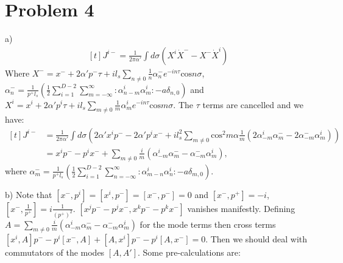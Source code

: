 \documentclass[12pt]{article}
\begin{document}
\section{Problem 4}
\begin{paragraph}{a)}
\begin{equation}
\begin{aligned}[t]
J^{i-}=\frac{1}{2\pi\alpha'}\int d\sigma (X^i \dot{X}^- - X^-\dot{X}^i)
\end{aligned}
\end{equation}
Where $X^-=x^-+2\alpha'p^-\tau+il_s\sum\limits_{n\neq 0}\frac{1}{n}\alpha_n^- e^{-in\tau}\text{cos}n\sigma$, $\alpha_n^-=\frac{1}{p^+l_s}(\frac{1}{2}\sum\limits_{i=1}^{D-2}\sum\limits_{m=-\infty}^{\infty}:\alpha_{n-m}^i\alpha_m^i:-a\delta_{n,0})$ and $X^i=x^i+2\alpha'p^i\tau+il_s\sum\limits_{m\neq 0}\frac{1}{m}\alpha_m^i e^{-in\tau}\text{cos}m\sigma$. The $\tau$ terms are cancelled and we have:
\begin{equation}
\begin{aligned}[t]
J^{i-}&=\frac{1}{2\pi\alpha'}\int d\sigma (2\alpha'x^i p^--2\alpha'p^i x^-+il_s^2\sum\limits_{m\neq 0}\text{cos}^2 m\alpha \frac{1}{m}(2\alpha_{-m}^i\alpha_m^- -2\alpha_{-m}^-\alpha_m^i))\\
&=x^i p^--p^i x^-+\sum\limits_{m\neq 0}\frac{i}{m}(\alpha_{-m}^i\alpha_m^- -\alpha_{-m}^-\alpha_m^i),
\end{aligned}
\end{equation}
where $\alpha_m^-=\frac{1}{p^+l_s}(\frac{1}{2}\sum\limits_{i=1}^{D-2}\sum\limits_{n=-\infty}^{\infty}:\alpha_{m-n}^i\alpha_n^i:-a\delta_{m,0})$.
\end{paragraph}
\begin{paragraph}{b)}
Note that $[x^-,p^i]=[x^i,p^-]=[x^-,p^-]=0$ and $[x^-,p^+]=-i$, $[x^-,\frac{1}{p^+} ]=i\frac{1}{(p^+)^2}$. $[x^j p^--p^j x^-,x^k p^--p^k x^-]$ vanishes manifestly. Defining $A=\sum\limits_{m\neq 0}\frac{i}{m}(\alpha_{-m}^i\alpha_m^- -\alpha_{-m}^-\alpha_m^i)$ for the mode terms then cross terms $[x^i,A]p^--p^i[x^-,A]+[A,x^i]p^--p^i[A,x^-]=0$. Then we should deal with commutators of the modes $[A,A']$. Some pre-calculations are:

\end{paragraph}
\end{document}
